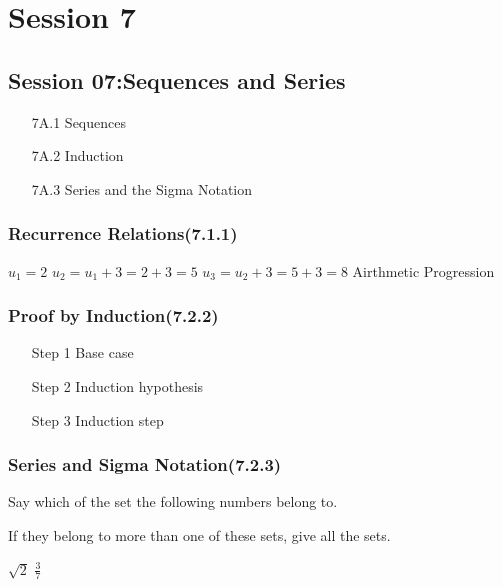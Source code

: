 \documentclass[]{report}
\begin{document}
	


\chapter{Session 7}


\section*{Session 07:Sequences and Series}
\begin{itemize}
\item[7A.1] Sequences
\item[7A.2] Induction
\item[7A.3] Series and the Sigma Notation
\end{itemize}

\subsection*{Recurrence Relations(7.1.1)}



$u_1 = 2$
$u_2 = u_1 + 3 = 2 +3 = 5$
$u_3 = u_2 + 3 = 5+ 3 = 8$
Airthmetic Progression


\subsection*{Proof by Induction(7.2.2)}
\begin{itemize}
\item[Step 1] Base case
\item[Step 2] Induction hypothesis
\item[Step 3] Induction step
\end{itemize}



\subsection*{Series and Sigma Notation(7.2.3)}




Say which of the set the following numbers belong to.

If they belong to more than one of these sets, give all the sets.

$\sqrt{2}$
$\frac{3}{7}$

\end{document}
